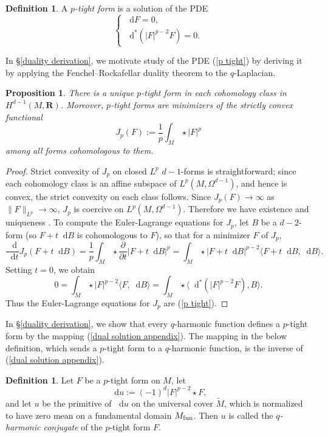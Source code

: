 \documentclass[reqno,11pt]{amsart}
\newcommand{\RR}{\mathbf{R}}
\newcommand*\dif{\mathop{}\!\mathrm{d}}
\newcommand{\dfn}[1]{\emph{#1}\index{#1}}
\newtheorem{proposition}[theorem]{Proposition}
\theoremstyle{definition}
\newtheorem{definition}[theorem]{Definition}
\numberwithin{equation}{section}
\begin{document}
\begin{definition}
A \dfn{$p$-tight form} is a solution of the PDE 
\begin{equation}\label{p tight}
\begin{cases}
\dif F = 0, \\ 
\dif^*(|F|^{p - 2} F) = 0.
\end{cases}
\end{equation}
\end{definition} 

In \S\ref{duality derivation}, we motivate study of the PDE (\ref{p tight}) by deriving it by applying the Fenchel--Rockafellar duality theorem to the $q$-Laplacian.

\begin{proposition}
There is a unique $p$-tight form in each cohomology class in $H^{d - 1}(M, \RR)$.
Moreover, $p$-tight forms are minimizers of the strictly convex functional
$$J_p(F) := \frac{1}{p} \int_M \star |F|^p$$
among all forms cohomologous to them.
\end{proposition}
\begin{proof}
Strict convexity of $J_p$ on closed $L^p$ $d - 1$-forms is straightforward; since each cohomology class is an affine subspace of $L^p(M, \Omega^{d - 1})$, and hence is convex, the strict convexity on each class follows.
Since $J_p(F) \to \infty$ as $\|F\|_{L^p} \to \infty$, $J_p$ is coercive on $L^p(M, \Omega^{d - 1})$.
Therefore we have existence and uniqueness \cite[Chapter II]{Ekeland99}.
To compute the Euler-Lagrange equations for $J_p$, let $B$ be a $d-2$-form (so $F + t \dif B$ is cohomologous to $F$), so that for a minimizer $F$ of $J_p$,
$$\frac{\dif}{\dif t} J_p(F + t \dif B) = \frac{1}{p} \int_M \star \frac{\partial}{\partial t} |F + t \dif B|^p = \int_M \star |F + t \dif B|^{p - 2} \langle F + t \dif B, \dif B\rangle.$$
Setting $t = 0$, we obtain 
$$0 = \int_M \star |F|^{p - 2} \langle F, \dif B\rangle = \int_M \star \langle \dif^*(|F|^{p - 2} F), B\rangle.$$
Thus the Euler-Lagrange equations for $J_p$ are (\ref{p tight}).
\end{proof}

In \S\ref{duality derivation}, we show that every $q$-harmonic function defines a $p$-tight form by the mapping (\ref{dual solution appendix}).
The mapping in the below definition, which sends a $p$-tight form to a $q$-harmonic function, is the inverse of (\ref{dual solution appendix}).

\begin{definition}
Let $F$ be a $p$-tight form on $M$, let
\begin{equation}
\dif u := (-1)^d |F|^{p - 2} \star F, \label{inverse extremality}
\end{equation}
and let $u$ be the primitive of $\dif u$ on the universal cover $\tilde M$, which is normalized to have zero mean on a fundamental domain $M_{\rm fun}$.
Then $u$ is called the \dfn{$q$-harmonic conjugate} of the $p$-tight form $F$.
\end{definition}
\end{document}
